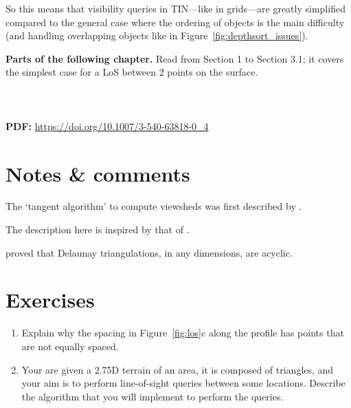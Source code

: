 So this means that visibility queries in TIN---like in grids---are greatly simplified compared to the general case where the ordering of objects is the main difficulty (and handling overlapping objects like in Figure~\ref{fig:depthsort_issues}).




\begin{kaobox-toread}[frametitle=\faExternalLink\ To read or to watch]
  \textbf{Parts of the following chapter.} 
  Read from Section 1 to Section 3.1; it covers the simplest case for a LoS between 2 points on the surface.
  \\ \\
   \\ \\
  \textbf{PDF:} \url{https://doi.org/10.1007/3-540-63818-0_4}
\end{kaobox-toread}



%
\section{Notes \& comments}

The `tangent algorithm' to compute viewsheds was first described by \citet{Blelloch90}.

The description here is inspired by that of \citet{DeFloriani99-1}.

\citet{Edelsbrunner90} proved that Delaunay triangulations, in any dimensions, are acyclic.

%
\section{Exercises}

\begin{enumerate}
  \item Explain why the spacing in Figure~\ref{fig:los}c along the profile has points that are not equally spaced.
  \item Your are given a 2.75D terrain of an area, it is composed of triangles, and your aim is to perform line-of-sight queries between some locations. Describe the algorithm that you will implement to perform the queries.
\end{enumerate}
